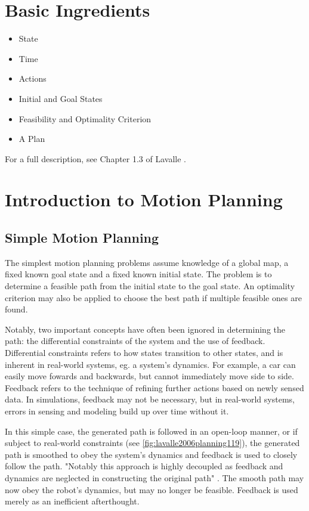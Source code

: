 \section{Basic Ingredients}
\begin{itemize}
\item State
\item Time
\item Actions
\item Initial and Goal States
\item Feasibility and Optimality Criterion
\item A Plan
\end{itemize}

For a full description, see Chapter 1.3 of Lavalle \cite{lavalle2006planning}.
\section{Introduction to Motion Planning}
\subsection{Simple Motion Planning}
The simplest motion planning problems assume knowledge of a global map, a fixed
known goal state and a fixed known initial state. The problem is to determine a
feasible path from the initial state to the goal state. An optimality criterion
may also be applied to choose the best path if multiple feasible ones are found.

Notably, two important concepts have often been ignored in determining the path:
the differential constraints of the system and the use of feedback. Differential
constraints refers to how states transition to other states, and is inherent in
real-world systems, eg. a system's dynamics. For example, a car can easily move
fowards and backwards, but cannot immediately move side to side. Feedback refers
to the technique of refining further actions based on newly sensed data. In
simulations, feedback may not be necessary, but in real-world systems, errors in
sensing and modeling build up over time without it.

In this simple case, the generated path is followed in an open-loop manner, or
if subject to real-world constraints (see \autoref{fig:lavalle2006planning119}),
the generated path is smoothed to obey the system's dynamics and feedback is
used to closely follow the path. "Notably this approach is highly decoupled as
feedback and dynamics are neglected in constructing the original path"
\cite{lavalle2006planning}. The smooth path may now obey the robot's dynamics,
but may no longer be feasible.  Feedback is used merely as an inefficient
afterthought.

